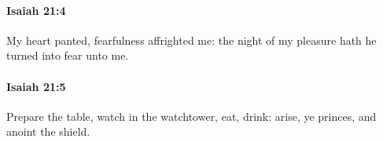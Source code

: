 		\paragraph{Isaiah 21:4} %
			\label{ISAIAH-21-4}

			My heart panted, fearfulness affrighted me: the night of my pleasure hath he turned into fear unto me.


		\paragraph{Isaiah 21:5} %
			\label{ISAIAH-21-5}

			Prepare the table, watch in the watchtower, eat, drink: arise, ye princes, and anoint the shield.


